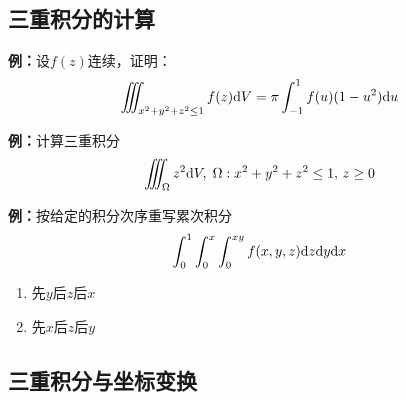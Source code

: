 \subsection{三重积分的计算}

{\bf 例：}设$f(z)$连续，证明：
$$\iiint_{x^2+y^2+z^2\leq 1}f(z)\mathrm{d} V=\pi\displaystyle\int_{-1}^1f(u)(1-u^2)\mathrm{d} u$$

{\bf 例：}计算三重积分
$$\iiint_{\Omega}z^2\mathrm{d} V,\;\Omega:x^2+y^2+z^2\leq 1,\,z\geq 0$$

{\bf 例：}按给定的积分次序重写累次积分
$$\displaystyle\int_0^1\displaystyle\int_0^x\displaystyle\int_0^{xy}f(x,y,z)\mathrm{d} z\mathrm{d} y\mathrm{d} x$$
\begin{enumerate}[(1)]
  \setlength{\itemindent}{1cm}
  \item 先$y$后$z$后$x$
  \item 先$x$后$z$后$y$
\end{enumerate}

\begin{center}
\end{center}

\subsection{三重积分与坐标变换}

